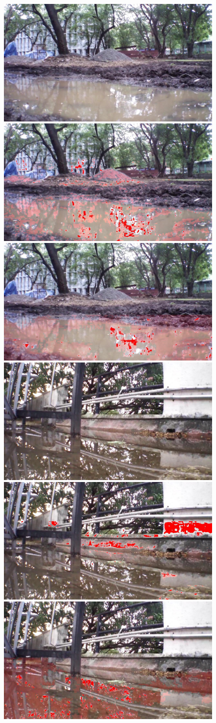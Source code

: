 \documentclass[times,10pt,twocolumn,letterpaper]{article}
\begin{document}
\begin{figure}
\centering
\includegraphics[width=0.31\linewidth]{images/results/dataset_63full/IMG_PAIR_102_1.jpg}
\includegraphics[width=0.31\linewidth]{images/results/dataset_63full/output_102_jpl2.jpg}
\includegraphics[width=0.31\linewidth]{images/results/dataset_63full/output_102.jpg}\\

\includegraphics[width=0.31\linewidth]{images/results/dataset_73/IMG_PAIR_124_1.jpg}
\includegraphics[width=0.31\linewidth]{images/results/dataset_73/output_124_jpl2.jpg}
\includegraphics[width=0.31\linewidth]{images/results/dataset_73/output_124.jpg}\\


\end{figure}
\end{document}
